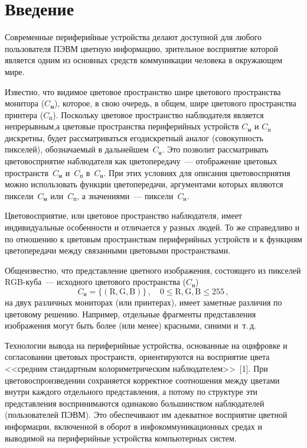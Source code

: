       \begin{multicols}{2}

      \label{st\stat}

  
\section{Введение}
  
  Современные периферийные устройства делают доступной для любого 
пользователя ПЭВМ цветную информацию, зрительное восприятие которой 
является одним из основных средств коммуникации человека в окружающем 
мире.
  
  Известно, что видимое цветовое пространство шире цветового пространства 
монитора ($C_{\mathrm{м}}$), которое, в свою очередь, в общем, шире 
цветового пространства принтера ($C_{\mathrm{п}}$). Поскольку цветовое 
пространство наблюдателя является непрерывным,\linebreak а цветовые пространства 
периферийных устройств $C_{\mathrm{м}}$ и $C_{\mathrm{п}}$ дискретны, 
будет рассматриваться его\linebreak дискретный аналог (совокупность пикселей), 
обозначаемый в дальнейшем~$C_{\mathrm{н}}$. Это позволит рас\-смат\-ри\-вать 
цветовосприятие наблюдателя как цветопередачу~--- отображение цветовых 
пространств~$C_{\mathrm{м}}$ и~$C_{\mathrm{п}}$ в~$C_{\mathrm{н}}$. 
При этих условиях для описания цветовосприятия можно использовать 
функции цветопередачи, аргументами которых являются 
пиксели~$C_{\mathrm{м}}$ или~$C_{\mathrm{п}}$, а значениями~--- 
пиксели~$C_{\mathrm{н}}$.
  
  Цветовосприятие, или цветовое пространство наблюдателя, имеет 
индивидуальные особенности и отличается у разных людей. То же справедливо 
и по отношению к цветовым пространствам периферийных устройств и к 
функциям цветопередачи между связанными цветовыми пространствами. 
  
  Общеизвестно, что представление цветного изоб\-ра\-же\-ния, состоящего из 
пикселей RGB-ку\-ба~--- исходного цветового пространства 
($C_{\mathrm{и}}$)
  $$
  C_{\mathrm{и}} = \{\left(\mathrm{R, G, B}\right)\}\,,\quad 0\leq \mathrm{R, G, B}\leq255\,,
  $$
на двух различных мониторах (или принтерах), имеет заметные различия по 
цветовому решению. Например, отдельные фрагменты представления 
изоб\-ра\-же\-ния могут быть более (или менее) красными, синими и~т.\,д. 
  
  Технологии вывода на периферийные устройства, основанные на оцифровке 
и согласовании цветовых пространств, ориентируются на восприятие цвета 
<<средним стандартным колориметрическим наблюдателем>>~[1].  При 
цветовоспроизведении сохраняется корректное соотношения между цветами 
внутри каждого отдельного представления, а потому по структуре эти 
представления воспринимаются одинаково большинством наблюдателей 
(пользователей ПЭВМ). Это обеспечивают им адекватное восприятие цветной 
информации, включенной в оборот в инфокоммуникационных средах и 
выводимой на периферийные устройства компьютерных систем. 
  

\end{multicols}
